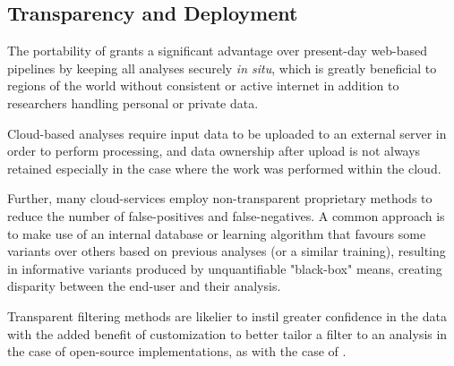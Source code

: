 \subsection{Transparency and Deployment}

The portability of \app grants a significant advantage over present-day web-based pipelines by keeping all analyses securely \textit{in situ}, which is greatly beneficial to regions of the world without consistent or active internet in addition to researchers handling personal or private data.

Cloud-based analyses require input data to be uploaded to an external server in order to perform processing, and data ownership after upload is not always retained especially in the case where the work was performed within the cloud.

Further, many cloud-services employ non-transparent proprietary methods to reduce the number of false-positives and false-negatives. A common approach is to make use of an internal database or learning algorithm that favours some variants over others based on previous analyses (or a similar training), resulting in informative variants produced by unquantifiable "black-box" means, creating disparity between the end-user and their analysis.

Transparent filtering methods are likelier to instil greater confidence in the data with the added benefit of customization to better tailor a filter to an analysis in the case of open-source implementations, as with the case of \app.
